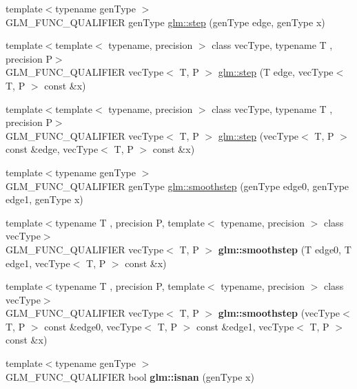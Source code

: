 \begin{DoxyCompactItemize}
{\footnotesize template$<$typename gen\+Type $>$ }\\G\+L\+M\+\_\+\+F\+U\+N\+C\+\_\+\+Q\+U\+A\+L\+I\+F\+I\+ER gen\+Type \hyperlink{group__core__func__common_ga015a1261ff23e12650211aa872863cce}{glm\+::step} (gen\+Type edge, gen\+Type x)
\item 
{\footnotesize template$<$template$<$ typename, precision $>$ class vec\+Type, typename T , precision P$>$ }\\G\+L\+M\+\_\+\+F\+U\+N\+C\+\_\+\+Q\+U\+A\+L\+I\+F\+I\+ER vec\+Type$<$ T, P $>$ \hyperlink{group__core__func__common_gaf15b74ab672af2c7d7b535a9b4803700}{glm\+::step} (T edge, vec\+Type$<$ T, P $>$ const \&x)
\item 
{\footnotesize template$<$template$<$ typename, precision $>$ class vec\+Type, typename T , precision P$>$ }\\G\+L\+M\+\_\+\+F\+U\+N\+C\+\_\+\+Q\+U\+A\+L\+I\+F\+I\+ER vec\+Type$<$ T, P $>$ \hyperlink{group__core__func__common_ga6d84170051fb87c183c38883ec85b411}{glm\+::step} (vec\+Type$<$ T, P $>$ const \&edge, vec\+Type$<$ T, P $>$ const \&x)
\item 
{\footnotesize template$<$typename gen\+Type $>$ }\\G\+L\+M\+\_\+\+F\+U\+N\+C\+\_\+\+Q\+U\+A\+L\+I\+F\+I\+ER gen\+Type \hyperlink{group__core__func__common_ga562edf7eca082cc5b7a0aaf180436daf}{glm\+::smoothstep} (gen\+Type edge0, gen\+Type edge1, gen\+Type x)
\item 
{\footnotesize template$<$typename T , precision P, template$<$ typename, precision $>$ class vec\+Type$>$ }\\G\+L\+M\+\_\+\+F\+U\+N\+C\+\_\+\+Q\+U\+A\+L\+I\+F\+I\+ER vec\+Type$<$ T, P $>$ {\bfseries glm\+::smoothstep} (T edge0, T edge1, vec\+Type$<$ T, P $>$ const \&x)
\item 
{\footnotesize template$<$typename T , precision P, template$<$ typename, precision $>$ class vec\+Type$>$ }\\G\+L\+M\+\_\+\+F\+U\+N\+C\+\_\+\+Q\+U\+A\+L\+I\+F\+I\+ER vec\+Type$<$ T, P $>$ {\bfseries glm\+::smoothstep} (vec\+Type$<$ T, P $>$ const \&edge0, vec\+Type$<$ T, P $>$ const \&edge1, vec\+Type$<$ T, P $>$ const \&x)
\item 
\mbox{\label{func__common_8inl_afd4cba966f582de51d0957ed0abdb244}} 
{\footnotesize template$<$typename gen\+Type $>$ }\\G\+L\+M\+\_\+\+F\+U\+N\+C\+\_\+\+Q\+U\+A\+L\+I\+F\+I\+ER bool {\bfseries glm\+::isnan} (gen\+Type x)

\end{DoxyCompactItemize}

